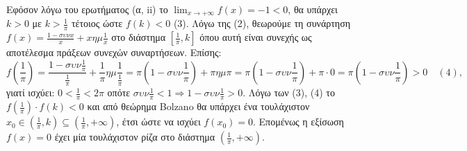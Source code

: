 \begin{alist}
\item Εφόσον λόγω του ερωτήματος (α, ii) το \( \lim_{x \to + \infty} f(x) = -1 < 0 \), θα υπάρχει $k > 0$ με $k > \frac{1}{\pi}$ τέτοιος ώστε $f(k) < 0$ (3).
Λόγω της (2), θεωρούμε τη συνάρτηση \( f(x) = \frac{1-\sigma\upsilon\nu x}{x} + x \eta \mu \frac{1}{x} \) στο διάστημα \( \left[ \frac{1}{\pi}, k \right] \) όπου αυτή είναι συνεχής ως αποτέλεσμα πράξεων συνεχών συναρτήσεων.
Επίσης:
\[ f \left( \frac{1}{\pi} \right) = \frac{1-\sigma\upsilon\nu \frac{1}{\pi}}{\frac{1}{\pi}} + \frac{1}{\pi} \eta \mu \frac{1}{\frac{1}{\pi}} = \pi (1-\sigma\upsilon\nu \frac{1}{\pi}) + \pi \eta \mu \pi = \pi (1-\sigma\upsilon\nu \frac{1}{\pi}) + \pi \cdot 0 = \pi (1-\sigma\upsilon\nu \frac{1}{\pi}) > 0 \quad (4), \]
γιατί ισχύει: \( 0 < \frac{1}{\pi} < 2\pi \) οπότε \( \sigma\upsilon\nu \frac{1}{\pi} < 1 \Rightarrow 1-\sigma\upsilon\nu \frac{1}{\pi} > 0 \).
Λόγω των (3), (4) το \( f \left( \frac{1}{\pi} \right) \cdot f(k) < 0 \) και από θεώρημα Bolzano θα υπάρχει ένα τουλάχιστον \( x_0 \in \left( \frac{1}{\pi}, k \right) \subseteq \left( \frac{1}{\pi}, + \infty \right) \), έτσι ώστε να ισχύει \( f(x_0) = 0 \). Επομένως η εξίσωση \( f(x)=0 \) έχει μία τουλάχιστον ρίζα στο διάστημα \( \left( \frac{1}{\pi}, + \infty \right) \).
\end{alist}